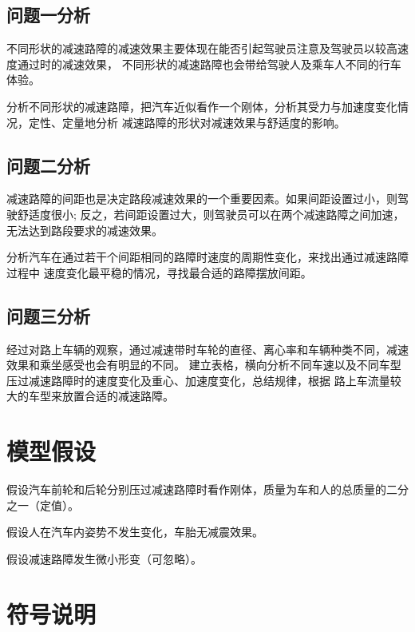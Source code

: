 \documentclass[withoutpreface,bwprint]{cumcmthesis}
\begin{document}
\subsection{问题一分析}

不同形状的减速路障的减速效果主要体现在能否引起驾驶员注意及驾驶员以较高速度通过时的减速效果，
不同形状的减速路障也会带给驾驶人及乘车人不同的行车体验。

分析不同形状的减速路障，把汽车近似看作一个刚体，分析其受力与加速度变化情况，定性、定量地分析
减速路障的形状对减速效果与舒适度的影响。

\subsection{问题二分析}

减速路障的间距也是决定路段减速效果的一个重要因素。如果间距设置过小，则驾驶舒适度很小;
反之，若间距设置过大，则驾驶员可以在两个减速路障之间加速，无法达到路段要求的减速效果。

分析汽车在通过若干个间距相同的路障时速度的周期性变化，来找出通过减速路障过程中
速度变化最平稳的情况，寻找最合适的路障摆放间距。

\subsection{问题三分析}

经过对路上车辆的观察，通过减速带时车轮的直径、离心率和车辆种类不同，减速效果和乘坐感受也会有明显的不同。
建立表格，横向分析不同车速以及不同车型压过减速路障时的速度变化及重心、加速度变化，总结规律，根据
路上车流量较大的车型来放置合适的减速路障。

\section{模型假设}

假设汽车前轮和后轮分别压过减速路障时看作刚体，质量为车和人的总质量的二分之一（定值）。

假设人在汽车内姿势不发生变化，车胎无减震效果。

假设减速路障发生微小形变（可忽略）。

\section{符号说明}
\end{document}

